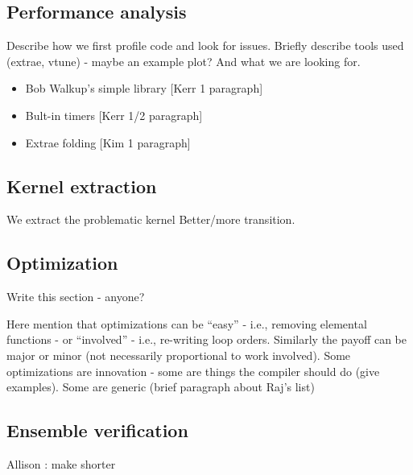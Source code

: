 \subsection{Performance analysis}

Describe how we first profile code and look for issues.  Briefly describe tools used (extrae, vtune) - maybe an example plot? And what we are looking for.

{\color{red}
 \begin{itemize}
   \item {Bob Walkup's simple library} [Kerr 1 paragraph]
   \item {Bult-in timers} [Kerr 1/2 paragraph]
   \item {Extrae folding} [Kim 1 paragraph]
 \end{itemize}
}


\subsection{Kernel extraction}

We extract the problematic kernel {\color{red} Better/more transition}.  



\subsection{Optimization}

 {\color{red} Write this section - anyone?}

Here mention that optimizations can be ``easy'' - i.e., removing elemental functions - or ``involved'' - i.e., re-writing loop orders.  Similarly the payoff can be major or minor (not necessarily proportional to work involved).
Some optimizations are innovation - some are things the compiler should do (give examples).  Some are generic (brief paragraph about Raj's list)


\subsection{Ensemble verification}

 {\color{red} Allison : make shorter}


